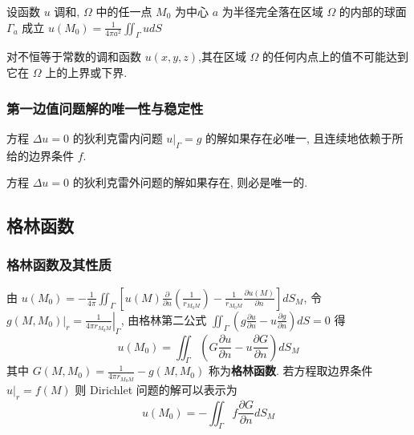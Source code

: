 \documentclass[10pt]{yerbaformat}
\begin{document}
\begin{theorem}[平均值定理]
    设函数 $u$ 调和, $\Omega$ 中的任一点 $M_{0}$ 为中心 $a$ 为半径完全落在区域 $\Omega$ 的内部的球面 $\Gamma_{a}$ 成立 $ u\left(M_{0}\right)=\frac{1}{4 \pi a^{2}} \iint_{\Gamma} u d S $
\end{theorem}

\begin{theorem}[极值原理]
    对不恒等于常数的调和函数 $u(x, y, z)$,其在区域 $\Omega$ 的任何内点上的值不可能达到它在 $\Omega$ 上的上界或下界.
\end{theorem}

\subsubsection{第一边值问题解的唯一性与稳定性}
\begin{theorem}
    方程 $\Delta u =0$ 的狄利克雷内问题 $\left.u\right|_{\Gamma}=g$ 的解如果存在必唯一, 且连续地依赖于所给的边界条件 $f$.
\end{theorem}

\begin{theorem} 
    方程 $\Delta u =0$ 的狄利克雷外问题的解如果存在, 则必是唯一的.
\end{theorem}

\subsection{格林函数}

\subsubsection{格林函数及其性质}
\par 由 $u\left(M_{0}\right)=-\frac{1}{4 \pi} \iint_{\Gamma}\left[u(M) \frac{\partial}{\partial n}\left(\frac{1}{r_{M_{0} M}}\right)-\frac{1}{r_{M_{0} M}} \frac{\partial u(M)}{\partial n}\right] d S_{M}$, 令 $\left.g\left(M, M_{0}\right)\right|_{r}=\left.\frac{1}{4 \pi r_{M_{0} M}}\right|_{\Gamma}$, 由格林第二公式 $\iint_{\Gamma}\left(g \frac{\partial u}{\partial n}-u \frac{\partial g}{\partial n}\right) d S=0$ 得 $$u\left(M_{0}\right)=\iint_{\Gamma}\left(G \frac{\partial u}{\partial n}-u \frac{\partial G}{\partial n}\right) d S_{M} $$ 其中 $G\left(M, M_{0}\right)=\frac{1}{4 \pi r_{M_{0} M}}-g\left(M, M_{0}\right)$ 称为\textbf{格林函数}. 若方程取边界条件 $\left.u\right|_{r}=f(M)$ 则 Dirichlet 问题的解可以表示为 $$u\left(M_{0}\right)=-\iint_{\Gamma} f \frac{\partial G}{\partial n} d S_{M}$$
\end{document}
